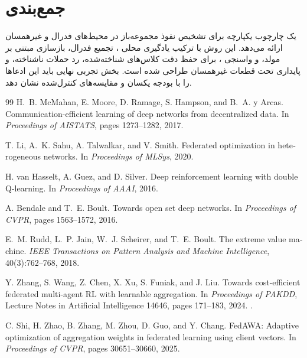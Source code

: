 \documentclass[10pt,twocolumn]{article}
\DeclareRobustCommand{\LatinTerm}[1]{\lr{{\LatinAcronymFont #1}}}
\newcommand{\CFMARLOS}{\texorpdfstring{\LatinTerm{CF-MARLOS-AVA}}{CF-MARLOS-AVA}}
\newcommand{\CVAEDQN}{\texorpdfstring{\LatinTerm{CVAE-DQN}}{CVAE-DQN}}
\newcommand{\EVT}{\texorpdfstring{\LatinTerm{EVT}}{EVT}}
\begin{document}
\section{جمع‌بندی}
\CFMARLOS{} یک چارچوب یکپارچه برای تشخیص نفوذ مجموعه‌باز در محیط‌های فدرال و غیرهمسان ارائه می‌دهد. این روش با ترکیب یادگیری محلی \CVAEDQN{}، تجمیع فدرال، بازسازی مبتنی بر مولد، و واسنجی \EVT{}، برای حفظ دقت کلاس‌های شناخته‌شده، رد حملات ناشناخته، و پایداری تحت قطعات غیرهمسان طراحی شده است. بخش تجربی نهایی باید این ادعاها را با بودجه یکسان و مقایسه‌های کنترل‌شده نشان دهد.

\begin{latin}
\begin{thebibliography}{99}
H.~B. McMahan, E. Moore, D. Ramage, S. Hampson, and B.~A. y Arcas.
\newblock Communication-efficient learning of deep networks from decentralized data.
\newblock In \emph{Proceedings of AISTATS}, pages 1273--1282, 2017.

T. Li, A.~K. Sahu, A. Talwalkar, and V. Smith.
\newblock Federated optimization in heterogeneous networks.
\newblock In \emph{Proceedings of MLSys}, 2020.

H. van Hasselt, A. Guez, and D. Silver.
\newblock Deep reinforcement learning with double Q-learning.
\newblock In \emph{Proceedings of AAAI}, 2016.

A. Bendale and T.~E. Boult.
\newblock Towards open set deep networks.
\newblock In \emph{Proceedings of CVPR}, pages 1563--1572, 2016.

E.~M. Rudd, L.~P. Jain, W.~J. Scheirer, and T.~E. Boult.
\newblock The extreme value machine.
\newblock \emph{IEEE Transactions on Pattern Analysis and Machine Intelligence}, 40(3):762--768, 2018.

Y. Zhang, S. Wang, Z. Chen, X. Xu, S. Funiak, and J. Liu.
\newblock Towards cost-efficient federated multi-agent RL with learnable aggregation.
\newblock In \emph{Proceedings of PAKDD}, Lecture Notes in Artificial Intelligence 14646, pages 171--183, 2024.
\newblock {}.

C. Shi, H. Zhao, B. Zhang, M. Zhou, D. Guo, and Y. Chang.
\newblock FedAWA: Adaptive optimization of aggregation weights in federated learning using client vectors.
\newblock In \emph{Proceedings of CVPR}, pages 30651--30660, 2025.
\end{thebibliography}
\end{latin}
\end{document}
